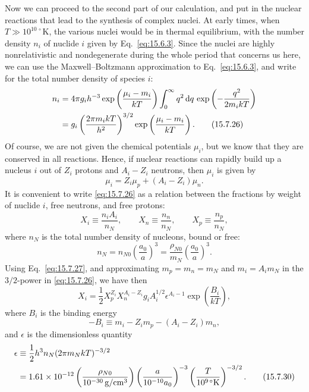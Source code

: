 Now we can proceed to the second part of our calculation, and put in the
nuclear reactions that lead to the synthesis of complex nuclei. At early
times, when \(T\gg10^{10\,\circ}\mathrm K\), the various nuclei would be in
thermal equilibrium, with the number density \(n_i\) of nuclide \(i\) given
by Eq.~\eqref{eq:15.6.3}. Since the nuclei are highly nonrelativistic and
nondegenerate during the whole period that concerns us here, we can use the
Maxwell--Boltzmann approximation to Eq.~\eqref{eq:15.6.3}, and write for the
total number density of species \(i\):
\begin{align}
  n_i
  &=
  4\pi g_i h^{-3}
  \exp\left(\frac{\mu_i-m_i}{kT}\right)
  \int_0^\infty q^2\mathop{}\!\mathrm{d} q\,
  \exp\left(-\frac{q^2}{2m_i kT}\right)
  \notag\\
  &=
  g_i
  \left(\frac{2\pi m_i kT}{h^2}\right)^{3/2}
  \exp\left(\frac{\mu_i-m_i}{kT}\right).
  \tag{15.7.26}\label{eq:15.7.26}
\end{align}
Of course, we are not given the chemical potentials \(\mu_i\), but we know
that they are conserved in all reactions. Hence, if nuclear reactions can
rapidly build up a nucleus \(i\) out of \(Z_i\) protons and \(A_i-Z_i\)
neutrons, then \(\mu_i\) is given by
\begin{equation}
  \mu_i=Z_i\mu_p+(A_i-Z_i)\mu_n.
  \tag{15.7.27}\label{eq:15.7.27}
\end{equation}
It is convenient to write \eqref{eq:15.7.26} as a relation between the
fractions by weight of nuclide \(i\), free neutrons, and free protons:
\[
  X_i\equiv\frac{n_iA_i}{n_N},
  \qquad
  X_n\equiv\frac{n_n}{n_N},
  \qquad
  X_p\equiv\frac{n_p}{n_N},
\]
where \(n_N\) is the total number density of nucleons, bound or free:
\[
  n_N
  =
  n_{N0}\left(\frac{a_0}{a}\right)^3
  =
  \frac{\rho_{N0}}{m_N}
  \left(\frac{a_0}{a}\right)^3.
\]
Using Eq.~\eqref{eq:15.7.27}, and approximating
\(m_p=m_n=m_N\) and \(m_i=A_im_N\) in the \(3/2\)-power in
\eqref{eq:15.7.26}, we have then
\begin{equation}
  X_i
  =
  \frac12
  X_p^{Z_i}
  X_n^{A_i-Z_i}
  g_iA_i^{1/2}
  \epsilon^{A_i-1}
  \exp\left(\frac{B_i}{kT}\right),
  \tag{15.7.28}\label{eq:15.7.28}
\end{equation}
where \(B_i\) is the binding energy
\begin{equation}
  -B_i\equiv m_i-Z_im_p-(A_i-Z_i)m_n,
  \tag{15.7.29}\label{eq:15.7.29}
\end{equation}
and \(\epsilon\) is the dimensionless quantity
\begin{align}
  \epsilon
  &\equiv
  \frac12h^3n_N(2\pi m_NkT)^{-3/2}
  \notag\\
  &=
  1.61\times10^{-12}
  \left(
    \frac{\rho_{N0}}{10^{-30}\,\mathrm{g/cm^3}}
  \right)
  \left(
    \frac{a}{10^{-10}a_0}
  \right)^{-3}
  \left(
    \frac{T}{10^{9\,\circ}\mathrm K}
  \right)^{-3/2}.
  \tag{15.7.30}\label{eq:15.7.30}
\end{align}
